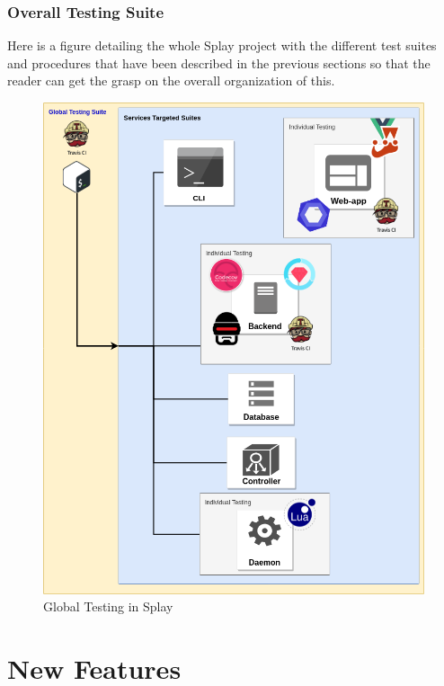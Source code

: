 \documentclass{eplmastersthesis}
\begin{document}
      \subsection{Overall Testing Suite}

        Here is a figure detailing the whole Splay project with the different
        test suites and procedures that have been described in the previous
        sections so that the reader can get the grasp on the overall
        organization of this.

        \begin{figure}[H]
          \centering
          \includegraphics[scale=0.55]{figures/global_testing.png}
          \caption{\label{global_testing} Global Testing in Splay}
        \end{figure}

    \chapter{New Features}
\end{document}
